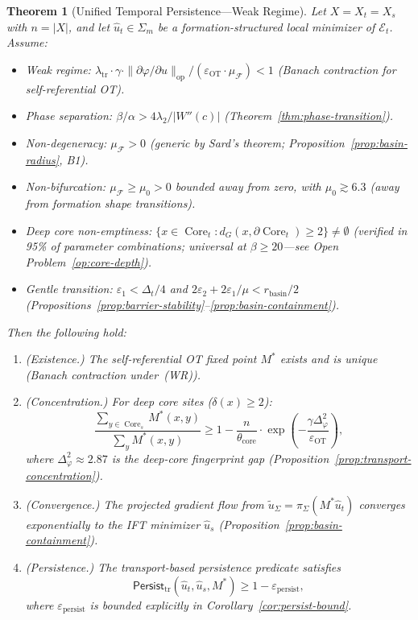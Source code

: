 \documentclass[lettersize,journal]{IEEEtran}
\newtheorem{theorem}{Theorem}
\DeclareMathOperator{\Core}{Core}
\begin{document}
\begin{theorem}[Unified Temporal Persistence---Weak Regime]
\label{thm:persist-full}
Let $X = X_t = X_s$ with $n = |X|$, and let $\hat{u}_t \in \Sigma_m$ be a formation-structured local minimizer of $\mathcal{E}_t$. Assume:
\begin{itemize}
\item[\emph{(WR)}] \emph{Weak regime:} $\lambda_{\mathrm{tr}} \cdot \gamma \cdot \|\partial\varphi/\partial u\|_{\mathrm{op}} / (\varepsilon_{\mathrm{OT}} \cdot \mu_{\mathcal{F}}) < 1$ (Banach contraction for self-referential OT).
\item[\emph{(PS)}] \emph{Phase separation:} $\beta/\alpha > 4\lambda_2/|W''(c)|$ (Theorem~\ref{thm:phase-transition}).
\item[\emph{(ND)}] \emph{Non-degeneracy:} $\mu_{\mathcal{F}} > 0$ (generic by Sard's theorem; Proposition~\ref{prop:basin-radius}, B1).
\item[\emph{(NB)}] \emph{Non-bifurcation:} $\mu_{\mathcal{F}} \geq \mu_0 > 0$ bounded away from zero, with $\mu_0 \gtrsim 6.3$ (away from formation shape transitions).
\item[\emph{(H2)}] \emph{Deep core non-emptiness:} $\{x \in \Core_t : d_G(x, \partial\Core_t) \geq 2\} \neq \emptyset$ (verified in 95\% of parameter combinations; universal at $\beta \geq 20$---see Open Problem~\ref{op:core-depth}).
\item[\emph{(GT)}] \emph{Gentle transition:} $\varepsilon_1 < \Delta_t/4$ and $2\varepsilon_2 + 2\varepsilon_1/\mu < r_{\mathrm{basin}}/2$ (Propositions~\ref{prop:barrier-stability}--\ref{prop:basin-containment}).
\end{itemize}
Then the following hold:
\begin{enumerate}
\item \emph{(Existence.)} The self-referential OT fixed point $M^*$ exists and is unique (Banach contraction under~(WR)).
\item \emph{(Concentration.)} For deep core sites ($\delta(x) \geq 2$):
\[
\frac{\sum_{y \in \Core_s} M^*(x,y)}{\sum_y M^*(x,y)} \geq 1 - \frac{n}{\theta_{\mathrm{core}}} \cdot \exp\!\left(-\frac{\gamma \Delta_\varphi^2}{\varepsilon_{\mathrm{OT}}}\right),
\]
where $\Delta_\varphi^2 \approx 2.87$ is the deep-core fingerprint gap (Proposition~\ref{prop:transport-concentration}).
\item \emph{(Convergence.)} The projected gradient flow from $\tilde{u}_\Sigma = \pi_\Sigma(M^* \hat{u}_t)$ converges exponentially to the IFT minimizer $\hat{u}_s$ (Proposition~\ref{prop:basin-containment}).
\item \emph{(Persistence.)} The transport-based persistence predicate satisfies
\[
\mathsf{Persist}_{\mathrm{tr}}(\hat{u}_t, \hat{u}_s, M^*) \geq 1 - \varepsilon_{\mathrm{persist}},
\]
where $\varepsilon_{\mathrm{persist}}$ is bounded explicitly in Corollary~\ref{cor:persist-bound}.
\end{enumerate}
\end{theorem}
\end{document}
